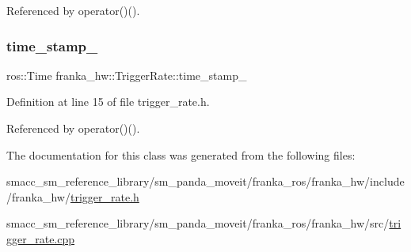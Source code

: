 Referenced by operator()().

\mbox{\label{classfranka__hw_1_1TriggerRate_a6cbf0023238a654a03405b33ef8272b5}} 
\subsubsection{\texorpdfstring{time\+\_\+stamp\+\_\+}{time\_stamp\_}}
{\footnotesize\ttfamily ros\+::\+Time franka\+\_\+hw\+::\+Trigger\+Rate\+::time\+\_\+stamp\+\_\+\hspace{0.3cm}{\ttfamily [private]}}



Definition at line 15 of file trigger\+\_\+rate.\+h.



Referenced by operator()().



The documentation for this class was generated from the following files\+:\begin{DoxyCompactItemize}
\item 
smacc\+\_\+sm\+\_\+reference\+\_\+library/sm\+\_\+panda\+\_\+moveit/franka\+\_\+ros/franka\+\_\+hw/include/franka\+\_\+hw/\hyperlink{trigger__rate_8h}{trigger\+\_\+rate.\+h}\item 
smacc\+\_\+sm\+\_\+reference\+\_\+library/sm\+\_\+panda\+\_\+moveit/franka\+\_\+ros/franka\+\_\+hw/src/\hyperlink{trigger__rate_8cpp}{trigger\+\_\+rate.\+cpp}\end{DoxyCompactItemize}
